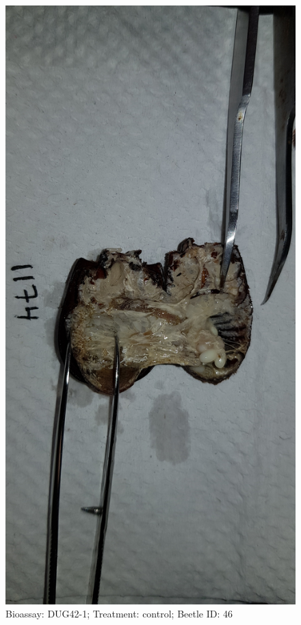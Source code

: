 \documentclass[11pt]{scrartcl}
\begin{document}
\begin{figure}[h!]
    \centering
    \includegraphics[width=\linewidth, height=\textheight, keepaspectratio]{uploads/btl.pm_image.925167688fe01c89.447567343220313137345f5265702d3120636f6e74726f6c2e6a7067.jpg}
    \caption{Bioassay: DUG42-1; Treatment: control; Beetle ID: 46}
\end{figure}
\clearpage
\end{document}
